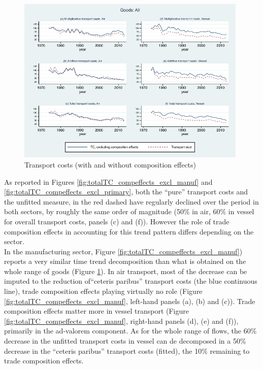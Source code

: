 \documentclass[11pt,twoside, authoryear]{elsarticle}
\begin{document}
\begin{figure}[htbp]
\caption{Transport costs (with and without composition effects)}
\label{fig:totalTC_compeffects_excl}
\begin{center}
\includegraphics[height=8cm]
{graph_composition_all.pdf}
\end{center}
\end{figure}

As reported in Figures \ref{fig:totalTC_compeffects_excl_manuf} and \ref{fig:totalTC_compeffects_excl_primary}, both the ``pure'' transport costs and the unfitted measure, in the red dashed have regularly declined over the period in both sectors, by roughly the same order of magnitude (50\% in air, 60\% in vessel for overall transport costs, panels (c) and (f)). However the role of trade composition effects in accounting for this trend pattern differs depending on the sector.\\
In the manufacturing sector, Figure \ref{fig:totalTC_compeffects_excl_manuf}) reports a very similar time trend decomposition than what is obtained on the whole range of goods (Figure \ref{fig:totalTC_compeffects_excl}).  In air transport, most of the decrease can be imputed to the reduction of``ceteris paribus'' transport costs (the blue continuous line), trade composition effects playing virtually no role (Figure \ref{fig:totalTC_compeffects_excl_manuf}, left-hand panels (a), (b) and (c)). Trade composition effects matter more in vessel transport (Figure \ref{fig:totalTC_compeffects_excl_manuf}, right-hand panels (d), (e) and (f)), primarily in the ad-valorem component. As for the whole range of flows, the 60\% decrease in the unfitted transport costs in vessel can de decomposed in a 50\% decrease in the ``ceteris paribus'' transport costs (fitted), the 10\% remaining to trade composition effects.
\end{document}
